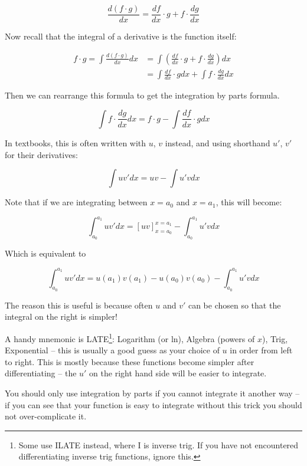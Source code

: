 \[\frac{d(f\cdot g)}{dx} = \frac{df}{dx}\cdot g + f \cdot \frac{dg}{dx}\]

Now recall that the integral of a derivative is the function itself:

\begin{align*}
f \cdot g = \int \frac{d(f\cdot g)}{dx} dx &= \int(\frac{df}{dx}\cdot g + f \cdot \frac{dg}{dx})dx \\
 &= \int\frac{df}{dx}\cdot g dx + \int f \cdot \frac{dg}{dx}dx
\end{align*} 

Then we can rearrange this formula to get the integration by parts formula.

\[ \int f \cdot \frac{dg}{dx} dx = f \cdot g - \int\frac{df}{dx}\cdot g dx  \]

In textbooks, this is often written with $u$, $v$ instead, and using shorthand 
$u'$, $v'$ for their derivatives:

\[ \int u v' dx = uv - \int u' v dx \]

Note that if we are integrating between $x=a_0$ and $x=a_1$, this will become:

\[ \int_{a_0}^{a_1} u v' dx = [uv]_{x=a_0}^{x=a_1} - \int_{a_0}^{a_1} u' v dx \]

Which is equivalent to 

\[ \int_{a_0}^{a_1} u v' dx = u(a_1)v(a_1) - u(a_0)v(a_0) - \int_{a_0}^{a_1} u' v dx \]

The reason this is useful is because often $u$ and $v'$ can be chosen so that the integral on the right is simpler!

A handy mnemonic is LATE\footnote{Some use ILATE instead, where I is inverse trig. If you have not encountered differentiating inverse trig functions, ignore this.}: 
Logarithm (or ln), Algebra (powers of $x$), Trig, Exponential -- this is usually a good guess as your choice of $u$ in order from left to right.
This is mostly because these functions become simpler after differentiating -- the $u'$ on the right hand side will be easier to integrate.

You should only use integration by parts if you cannot integrate it another way -- if you can see that your function is easy to integrate without this trick 
you should not over-complicate it.

